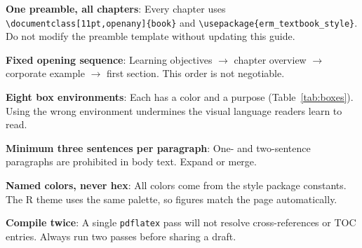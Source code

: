\documentclass[11pt,openany]{book}
\newcommand{\code}[1]{\texttt{\small #1}}
\begin{document}
\begin{keytakeaways}
\item
  \textbf{One preamble, all chapters}: Every chapter uses \code{\textbackslash documentclass[11pt,openany]\{book\}} and \code{\textbackslash usepackage\{erm\_textbook\_style\}}. Do not modify the preamble template without updating this guide.
\item
  \textbf{Fixed opening sequence}: Learning objectives $\to$ chapter overview $\to$ corporate example $\to$ first section. This order is not negotiable.
\item
  \textbf{Eight box environments}: Each has a color and a purpose (Table~\ref{tab:boxes}). Using the wrong environment undermines the visual language readers learn to read.
\item
  \textbf{Minimum three sentences per paragraph}: One- and two-sentence paragraphs are prohibited in body text. Expand or merge.
\item
  \textbf{Named colors, never hex}: All colors come from the style package constants. The R theme uses the same palette, so figures match the page automatically.
  \item
  \textbf{Compile twice}: A single \code{pdflatex} pass will not resolve cross-references or TOC entries. Always run two passes before sharing a draft.
\end{keytakeaways}
\end{document}
